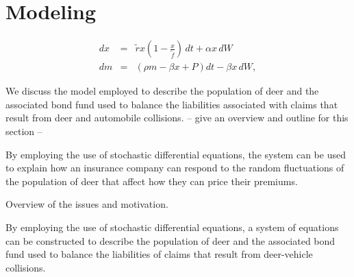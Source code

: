 

\section{Modeling}

\begin{eqnarray}
dx &=& \tilde{r}x \left( 1- \frac{x}{\tilde{f}} \right) \, dt + \alpha x \, dW \label{eq:dx} \\
dm &=& (\rho m - \beta x + P )dt - \beta x \, dW, \label{eq:dm}
\end{eqnarray}

We discuss the model employed to describe the population of deer and
the associated bond fund used to balance the liabilities associated
with claims that result from deer and automobile collisions. -- give
an overview and outline for this section --

By employing the use of stochastic differential equations, the system can be used to explain how an insurance company can respond to the random fluctuations of the population of deer that affect how they can price their premiums. 

Overview of the issues and motivation.


 
By employing the use of stochastic differential equations, a system of equations can be constructed to describe the population of deer and the associated bond fund used to balance the liabilities of claims that result from deer-vehicle collisions. 





